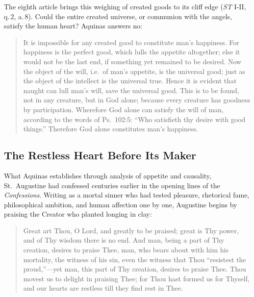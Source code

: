 The eighth article brings this weighing of created goods to its cliff edge (\emph{ST} I-II, q.\,2, a.\,8). Could the entire created universe, or communion with the angels, satisfy the human heart? Aquinas answers no:

\begin{quote}
It is impossible for any created good to constitute man's happiness. For happiness is the perfect good, which lulls the appetite altogether; else it would not be the last end, if something yet remained to be desired. Now the object of the will, i.e.\ of man's appetite, is the universal good; just as the object of the intellect is the universal true. Hence it is evident that naught can lull man's will, save the universal good. This is to be found, not in any creature, but in God alone; because every creature has goodness by participation. Wherefore God alone can satisfy the will of man, according to the words of Ps.\ 102:5: ``Who satisfieth thy desire with good things.'' Therefore God alone constitutes man's happiness.
\end{quote}

\subsection*{The Restless Heart Before Its Maker}

What Aquinas establishes through analysis of appetite and causality, St.\ Augustine had confessed centuries earlier in the opening lines of the \emph{Confessions}. Writing as a mortal sinner who had tested pleasure, rhetorical fame, philosophical ambition, and human affection one by one, Augustine begins by praising the Creator who planted longing in clay:

\begin{quote}
Great art Thou, O Lord, and greatly to be praised; great is Thy power, and of Thy wisdom there is no end. And man, being a part of Thy creation, desires to praise Thee, man, who bears about with him his mortality, the witness of his sin, even the witness that Thou ``resistest the proud,''---yet man, this part of Thy creation, desires to praise Thee. Thou movest us to delight in praising Thee; for Thou hast formed us for Thyself, and our hearts are restless till they find rest in Thee.
\end{quote}

